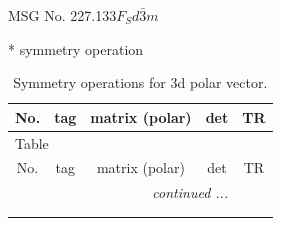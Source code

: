 \documentclass[fleqn,8pt]{jsarticle}
\begin{document}
\setcounter{MaxMatrixCols}{32}

\renewcommand{\tablename}{Table~}
\renewcommand{\figurename}{Figure~}
\begin{center}
\LARGE
MSG No. 227.133\quad$F_{S}d\bar{3}m$
\end{center}
* symmetry operation
\renewcommand{\arraystretch}{1.3}
\begin{longtable}{ccccc}
\caption{Symmetry operations for 3d polar vector.}
 \\
 \hline \hline
No. & tag & matrix (polar) & det & TR \\ \hline \endfirsthead

\multicolumn{4}{l}{\tablename\ \thetable{}} \\
 \hline \hline
No. & tag & matrix (polar) & det & TR \\ \hline \endhead

 \hline \hline
\multicolumn{4}{r}{\footnotesize\it continued ...} \\ \endfoot

 \hline \hline
\multicolumn{4}{r}{} \\ \endlastfoot


\end{longtable}
\end{document}
